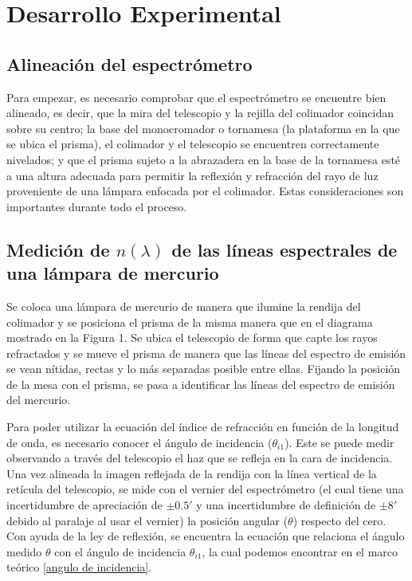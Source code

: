 \documentclass[article,12pt]{elsarticle}
\begin{document}
\section{Desarrollo Experimental}

\subsection{Alineación del espectrómetro}

Para empezar, es necesario comprobar que el espectrómetro se encuentre bien alineado, es decir, que la mira del telescopio y la rejilla del colimador coincidan sobre su centro; la base del monocromador o tornamesa (la plataforma en la que se ubica el prisma), el colimador y el telescopio se encuentren correctamente nivelados; y que el prisma sujeto a la abrazadera en la base de la tornamesa esté a una altura adecuada para permitir la reflexión y refracción del rayo de luz proveniente de una lámpara enfocada por el colimador. Estas consideraciones son importantes durante todo el proceso.

\subsection{Medición de $n(\lambda)$ de las líneas espectrales de una lámpara de mercurio}

Se coloca una lámpara de mercurio de manera que ilumine la rendija del colimador y se posiciona el prisma de la misma manera que en el diagrama mostrado en la Figura 1. Se ubica el telescopio de forma que capte los rayos refractados y se mueve el prisma de manera que las líneas del espectro de emisión se vean nítidas, rectas y lo más separadas posible entre ellas. Fijando la posición de la mesa con el prisma, se pasa a identificar las líneas del espectro de emisión del mercurio.

Para poder utilizar la ecuación del índice de refracción en función de la longitud de onda, es necesario conocer el ángulo de incidencia ($\theta_{i1}$). Este se puede medir observando a través del telescopio el haz que se refleja en la cara de incidencia. Una vez alineada la imagen reflejada de la rendija con la línea vertical de la retícula del telescopio, se mide con el vernier del espectrómetro (el cual tiene una incertidumbre de apreciación de $\pm 0.5'$ y una incertidumbre de definición de $\pm 8'$ debido al paralaje al usar el vernier) la posición angular ($\theta$) respecto del cero. Con ayuda de la ley de reflexión, se encuentra la ecuación que relaciona el ángulo medido $\theta$ con el ángulo de incidencia $\theta_{i1}$, la cual podemos encontrar en el marco teórico \eqref{angulo de incidencia}.
\end{document}
